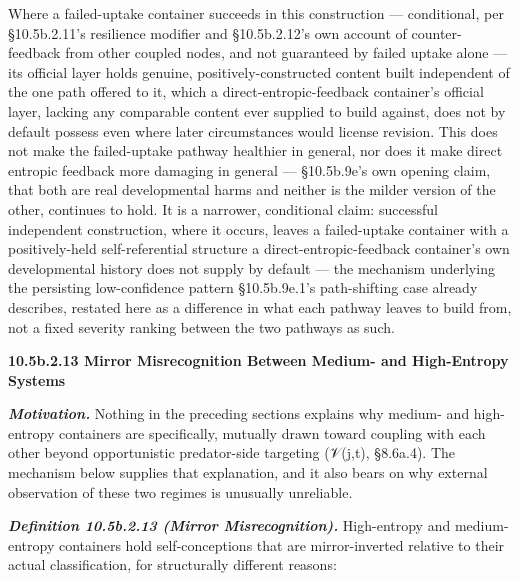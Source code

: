 \documentclass[
]{article}
\begin{document}
Where a failed-uptake container succeeds in this construction ---
conditional, per §10.5b.2.11's resilience modifier and §10.5b.2.12's own
account of counter-feedback from other coupled nodes, and not guaranteed
by failed uptake alone --- its official layer holds genuine,
positively-constructed content built independent of the one path offered
to it, which a direct-entropic-feedback container's official layer,
lacking any comparable content ever supplied to build against, does not
by default possess even where later circumstances would license
revision. This does not make the failed-uptake pathway healthier in
general, nor does it make direct entropic feedback more damaging in
general --- §10.5b.9e's own opening claim, that both are real
developmental harms and neither is the milder version of the other,
continues to hold. It is a narrower, conditional claim: successful
independent construction, where it occurs, leaves a failed-uptake
container with a positively-held self-referential structure a
direct-entropic-feedback container's own developmental history does not
supply by default --- the mechanism underlying the persisting
low-confidence pattern §10.5b.9e.1's path-shifting case already
describes, restated here as a difference in what each pathway leaves to
build from, not a fixed severity ranking between the two pathways as
such.

\textbf{10.5b.2.13 Mirror Misrecognition Between Medium- and
High-Entropy Systems}

\emph{\textbf{Motivation.}} Nothing in the preceding sections explains
why medium- and high-entropy containers are specifically, mutually drawn
toward coupling with each other beyond opportunistic predator-side
targeting (𝒱(j,t), §8.6a.4). The mechanism below supplies that
explanation, and it also bears on why external observation of these two
regimes is unusually unreliable.

\emph{\textbf{Definition 10.5b.2.13 (Mirror Misrecognition).}}
High-entropy and medium-entropy containers hold self-conceptions that
are mirror-inverted relative to their actual classification, for
structurally different reasons:
\end{document}
